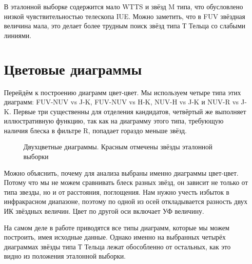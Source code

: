 В эталонной выборке содержится мало WTTS и звёзд M типа, что обусловлено низкой чувствительностью телескопа IUE. Можно заметить, что в FUV звёздная величина мала, это делает более трудным поиск звёзд типа Т Тельца со слабыми линиями.

\section{Цветовые диаграммы}
Перейдём к построению диаграмм цвет-цвет. Мы используем четыре типа этих диаграмм: FUV-NUV vs J-K, FUV-NUV vs H-K, NUV-H vs J-K и NUV-R vs J-K. Первые три существенны для отделения кандидатов, четвёртый же выполняет иллюстративную функцию, так как на диаграмму этого типа, требующую наличия блеска в фильтре R, попадает гораздо меньше звёзд.

\begin{figure}[ht]
\begin{minipage}[ht]{0.49\linewidth}
\end{minipage}
\hfill
\begin{minipage}[ht]{0.49\linewidth}
\end{minipage}
\begin{minipage}[ht]{0.49\linewidth}
\end{minipage}
\hfill
\begin{minipage}[ht]{0.49\linewidth}
\end{minipage}
\caption{Двухцветные диаграммы. Красным отмечены звёзды эталонной выборки}
\label{fig:colcol}
\end{figure}
Можно объяснить, почему для анализа выбраны именно диаграммы цвет-цвет. Потому что мы не можем сравнивать блеск разных звёзд, он зависит не только от типа звезды, но и от расстояния, поглощения. Нам нужно учесть избыток в инфракрасном диапазоне, поэтому по одной из осей откладывается разность двух ИК звёздных величин. Цвет по другой оси включает УФ величину.

На самом деле в работе \cite{AIGdC2014galex}  приводятся все типы диаграмм, которые мы можем построить, имея исходные данные. Однако именно на выбранных четырёх диаграммах звёзды типа Т Тельца лежат обособленно от остальных, как это видно из положения эталонной выборки.

